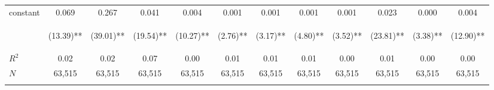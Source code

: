 \begin{tabular}{lccccccccccc}
\noalign{\smallskip}constant & 0.069 & 0.267 & 0.041 & 0.004 & 0.001 & 0.001 & 0.001 & 0.001 & 0.023 & 0.000 & 0.004\\
 & \begin{footnotesize}(13.39)**\end{footnotesize} & \begin{footnotesize}(39.01)**\end{footnotesize} & \begin{footnotesize}(19.54)**\end{footnotesize} & \begin{footnotesize}(10.27)**\end{footnotesize} & \begin{footnotesize}(2.76)**\end{footnotesize} & \begin{footnotesize}(3.17)**\end{footnotesize} & \begin{footnotesize}(4.80)**\end{footnotesize} & \begin{footnotesize}(3.52)**\end{footnotesize} & \begin{footnotesize}(23.81)**\end{footnotesize} & \begin{footnotesize}(3.38)**\end{footnotesize} & \begin{footnotesize}(12.90)**\end{footnotesize}\\
\noalign{\smallskip}$R^2$ & 0.02 & 0.02 & 0.07 & 0.00 & 0.01 & 0.01 & 0.01 & 0.00 & 0.01 & 0.00 & 0.00\\
$N$ & 63,515 & 63,515 & 63,515 & 63,515 & 63,515 & 63,515 & 63,515 & 63,515 & 63,515 & 63,515 & 63,515\\
\noalign{\smallskip}\bottomrule\end{tabular}
